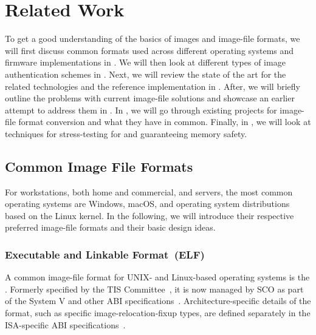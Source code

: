 \chapter{Related Work} %
\label{chap:related_work}

To get a good understanding of the basics of \glspl{image} and \gls{image-file} formats, we will first discuss common formats used across different operating systems and \gls{firmware} implementations in . We will then look at different types of \gls{image} authentication schemes in . Next, we will review the state of the art for the related  technologies and the reference implementation in . After, we will briefly outline the problems with current \gls{image-file} solutions and showcase an earlier attempt to address them in . In , we will go through existing projects for \gls{image-file} format conversion and what they have in common. Finally, in , we will look at techniques for stress-testing for and guaranteeing memory safety.

\section{Common Image File Formats}
\label{sec:cmn_formats}

For workstations, both home and commercial, and servers, the most common operating systems are  Windows,  macOS, and operating system distributions based on the Linux kernel. In the following, we will introduce their respective preferred \gls{image-file} formats and their basic design ideas.

\subsection{Executable and Linkable Format~(ELF)}
\label{sec:elf}

A common \gls{image-file} format for UNIX- and Linux-based operating systems is the . Formerly specified by the \gls{TIS} Committee~\cite{elf-spec}, it is now managed by \gls{SCO} as part of the System V and other \gls{ABI} specifications~\cite{arm64-elf,sysVGABI,sysVUpdate}. Architecture-specific details of the format, such as specific \gls{image-relocation-fixup} types, are defined separately in the \gls{ISA}-specific \gls{ABI} specifications~\cite{arm64-elf,sysVUpdate,sysVi386}.

